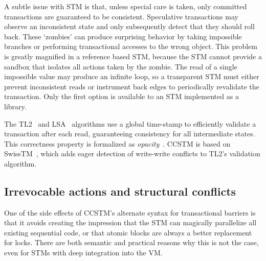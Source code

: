 A subtle issue with STM is that, unless special care is taken, only
committed transactions are guaranteed to be consistent.  Speculative
transactions may observe an inconsistent state and only subsequently
detect that they should roll back.  These `zombies' can produce
surprising behavior by taking impossible branches or performing
transactional accesses to the wrong object.  This problem is greatly
magnified in a reference based STM, because the STM cannot provide a
sandbox that isolates all actions taken by the zombie.  The read of a
single impossible value may produce an infinite loop, so a transparent
STM must either prevent inconsistent reads or instrument back edges
to periodically revalidate the transaction.  Only the first option is
available to an STM implemented as a library.

The TL2~\cite{dice06tl2} and LSA~\cite{riegel06lsa} algorithms
use a global time-stamp to efficiently validate
a transaction after each read, guaranteeing consistency for all
intermediate states.  This correctness property is formalized
as \textit{opacity}~\cite{guerraoui08opacity}.  CCSTM is based on
SwissTM~\cite{dragojevic09swisstm}, which adds eager detection of
write-write conflicts to TL2's validation algorithm.

\subsection{Irrevocable actions and structural conflicts}

One of the side effects of CCSTM's alternate syntax for transactional barriers
is that it avoids creating the impression that the STM can magically
parallelize all existing sequential code, or that atomic blocks are
always a better replacement for locks.  There are both semantic and
practical reasons why this is not the case, even for STMs with deep
integration into the VM.

